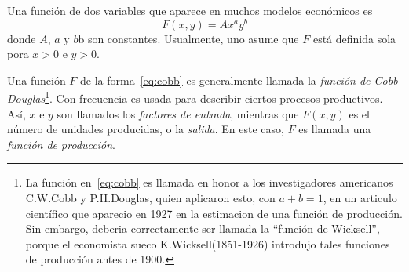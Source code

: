 \begin{example}
	Una función de dos variables que aparece en muchos modelos económicos es
	\begin{equation}\label{eq:cobb}
	F\left(x,y\right)=Ax^{a}y^{b}
	\end{equation}
	donde $A$, $a$ y $b$b son constantes. Usualmente, uno asume que $F$ está definida sola pora $x>0$ e $y>0$.

	Una función $F$ de la forma~\eqref{eq:cobb} es generalmente llamada la \emph{función de Cobb-Douglas}\footnote{La función en~\eqref{eq:cobb} es llamada en honor a los investigadores americanos C.W.Cobb y P.H.Douglas, quien aplicaron esto, con  $a+b=1$, en un articulo científico que aparecio en 1927 en la estimacion de una función de producción. Sin embargo, deberia correctamente ser llamada la ``función de Wicksell'', porque el economista sueco K.Wicksell(1851-1926) introdujo tales funciones de producción antes de 1900.}. Con frecuencia es usada para describir ciertos procesos productivos. Así, $x$ e $y$ son llamados los \emph{factores de entrada}, mientras que $F\left(x,y\right)$ es el número de unidades producidas, o la \emph{salida}. En este caso, $F$ es llamada una \emph{función de producción}.
\end{example}

